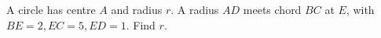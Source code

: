 A circle has centre $A$ and radius $r$. A radius $AD$ meets chord $BC$ at $E$, with $BE=2,EC=5,ED=1$. Find $r$.
